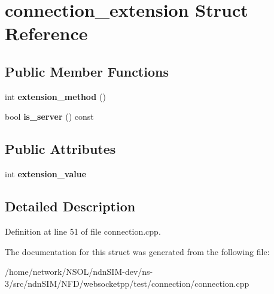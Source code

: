 \hypertarget{structconnection__extension}{}\section{connection\+\_\+extension Struct Reference}
\label{structconnection__extension}
\subsection*{Public Member Functions}
\begin{DoxyCompactItemize}
\item 
int {\bfseries extension\+\_\+method} ()\hypertarget{structconnection__extension_ad2436b6e3953940e8e0ca995c5b003e7}{}\label{structconnection__extension_ad2436b6e3953940e8e0ca995c5b003e7}

\item 
bool {\bfseries is\+\_\+server} () const\hypertarget{structconnection__extension_a90b4a4663b04e2514ad8bc704988100b}{}\label{structconnection__extension_a90b4a4663b04e2514ad8bc704988100b}

\end{DoxyCompactItemize}
\subsection*{Public Attributes}
\begin{DoxyCompactItemize}
\item 
int {\bfseries extension\+\_\+value}\hypertarget{structconnection__extension_a4e5b9636e552953e476719b0fd596c8b}{}\label{structconnection__extension_a4e5b9636e552953e476719b0fd596c8b}

\end{DoxyCompactItemize}


\subsection{Detailed Description}


Definition at line 51 of file connection.\+cpp.



The documentation for this struct was generated from the following file\+:\begin{DoxyCompactItemize}
\item 
/home/network/\+N\+S\+O\+L/ndn\+S\+I\+M-\/dev/ns-\/3/src/ndn\+S\+I\+M/\+N\+F\+D/websocketpp/test/connection/connection.\+cpp\end{DoxyCompactItemize}
